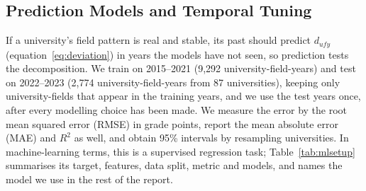 
\subsection{Prediction Models and Temporal Tuning}
\label{sec:methods-prediction}

If a university's field pattern is real and stable, its past should predict $d_{ufy}$ (equation~\eqref{eq:deviation}) in years the models have not seen, so prediction tests the decomposition. We train on 2015--2021 (9,292 university-field-years) and test on 2022--2023 (2,774 university-field-years from 87 universities), keeping only university-fields that appear in the training years, and we use the test years once, after every modelling choice has been made. We measure the error by the root mean squared error (RMSE) in grade points, report the mean absolute error (MAE) and $R^2$ as well, and obtain 95\% intervals by resampling universities. In machine-learning terms, this is a supervised regression task; Table~\ref{tab:mlsetup} summarises its target, features, data split, metric and models, and names the model we use in the rest of the report.



